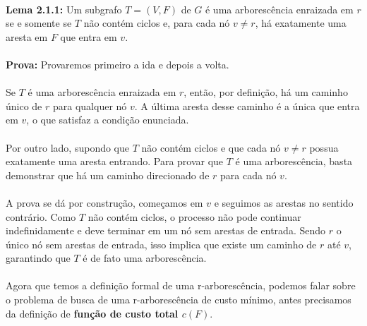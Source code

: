 \documentclass[12pt,a4paper]{article}
\begin{document}
\paragraph{}
\textbf{Lema 2.1.1:} Um subgrafo \(T = (V, F)\) de \(G\) é uma arborescência enraizada em \(r\) se e somente se \(T\) não contém ciclos e, para cada nó \(v \neq r\), há exatamente uma aresta em \(F\) que entra em \(v\).

\paragraph{}
\textbf{Prova:} Provaremos primeiro a ida e depois a volta.

\paragraph{}
Se \(T\) é uma arborescência enraizada em \(r\), então, por definição, há um caminho único de \(r\) para qualquer nó \(v\). A última aresta desse caminho é a única que entra em \(v\), o que satisfaz a condição enunciada.

\paragraph{}
Por outro lado, supondo que \(T\) não contém ciclos e que cada nó \(v \neq r\) possua exatamente uma aresta entrando. Para provar que \(T\) é uma arborescência, basta demonstrar que há um caminho direcionado de \(r\) para cada nó \(v\). 

\paragraph{}
A prova se dá por construção, começamos em \(v\) e seguimos as arestas no sentido contrário. Como \(T\) não contém ciclos, o processo não pode continuar indefinidamente e deve terminar em um nó sem arestas de entrada. Sendo \(r\) o único nó sem arestas de entrada, isso implica que existe um caminho de \(r\) até \(v\), garantindo que \(T\) é de fato uma arborescência.

\paragraph{}
Agora que temos a definição formal de uma r-arborescência, podemos falar sobre o problema de busca de uma r-arborescência de custo mínimo, antes precisamos da definição de \textbf{função de custo total \(c(F)\)}.
\end{document}
